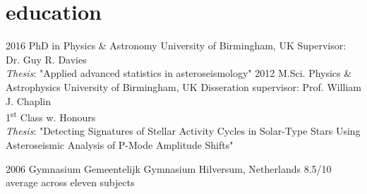 \documentclass[]{k-cv} %
\begin{document}

\section{\color{c1}education}

\begin{entrylist}
\centry
{2016 }
{PhD {\normalfont in Physics \& Astronomy}}
{University of Birmingham, UK}
{Supervisor: Dr. Guy R. Davies\\
\textit{Thesis}: "Applied advanced statistics in asteroseismology"} 
\centry
{2012 }
{M.Sci. {\normalfont Physics \& Astrophysics}}
{University of Birmingham, UK}
{Disseration supervisor: Prof. William J. Chaplin\\
1\textsuperscript{st} Class w. Honours\\ \textit{Thesis}: "Detecting Signatures of Stellar Activity Cycles in Solar-Type Stars Using Asteroseismic Analysis of P-Mode Amplitude Shifts"}



\centry
{2006 }
{Gymnasium}
{Gemeentelijk Gymnasium Hilversum, Netherlands}
{8.5/10 average across eleven subjects}
\end{entrylist}
\end{document}
